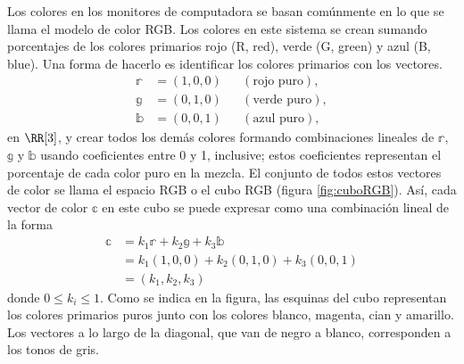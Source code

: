 \begin{adjustwidth}{-7.6cm}{-2cm}
    \begin{tcolorbox}[
        theorem style=change break,
        enhanced,
        breakable,
        boxrule=0pt,
        frame hidden,
        left = 1.8cm,
        right = 1.8cm,
        top=4mm,
        bottom=2mm,
        colback=black!7!white,
        coltitle=black,
        attach title to upper={\ },
        sharp corners,
        borderline north={1.5pt}{0pt}{black},
        title = {Aplicación de combinaciones lineales a modelos de color:},
        fonttitle=\selectfont\Lato\bfseries\LARGE,
        fontupper=\normalsize
    ]
        \begin{multicols}{2}
            Los colores en los monitores de computadora se basan comúnmente en lo que se llama el modelo de color RGB. Los colores en este sistema se crean sumando porcentajes de los colores primarios rojo (R, red), verde (G, green) y azul (B, blue). Una forma de hacerlo es identificar los colores primarios con los vectores.
            \begin{align*}
                \mathbb{r} & = (1, 0, 0) && (\text{rojo puro}), \\
                \mathbb{g} & = (0, 1, 0) && (\text{verde puro}), \\
                \mathbb{b} & = (0, 0, 1) && (\text{azul puro}),
            \end{align*}
            en $\RR[3]$, y crear todos los demás colores formando combinaciones lineales de $\mathbb{r}$, $\mathbb{g}$ y $\mathbb{b}$ usando coeficientes entre 0 y 1, inclusive; estos coeficientes representan el porcentaje de cada color puro en la mezcla. El conjunto de todos estos vectores de color se llama el espacio RGB o el cubo RGB (figura \ref{fig:cuboRGB}). Así, cada vector de color $\mathbb{c}$ en este cubo se puede expresar como una combinación lineal de la forma
            \begin{align*}
                \mathbb{c} & = k_1\mathbb{r} + k_2\mathbb{g} + k_3\mathbb{b} \\
                & = k_1(1, 0, 0) + k_2(0, 1, 0) + k_3(0, 0, 1) \\
                & = (k_1, k_2, k_3)
            \end{align*}
            donde $0 \leq k_i \leq 1$. Como se indica en la figura, las esquinas del cubo representan los colores primarios puros junto con los colores blanco, magenta, cian y amarillo. Los vectores a lo largo de la diagonal, que van de negro a blanco, corresponden a los tonos de gris.

\end{multicols}
\end{tcolorbox}
\end{adjustwidth}
